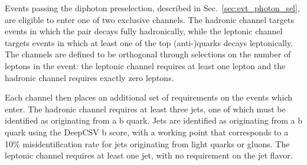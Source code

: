 Events passing the diphoton preselection, described in Sec.~\ref{sec:evt_photon_sel}, are eligible to enter one of two exclusive channels.
The hadronic channel targets \ttH events in which the \ttb pair decays fully hadronically, while the leptonic channel targets events in which at least one of the top (anti-)quarks decays leptonically.
The channels are defined to be orthogonal through selections on the number of leptons in the event: the leptonic channel requires at least one lepton and the hadronic channel requires exactly zero leptons.

Each channel then places an additional set of requirements on the events which enter.
The hadronic channel requires at least three jets, one of which must be identified as originating from a b quark.
Jets are identified as originating from a b quark using the DeepCSV b score, with a working point that corresponds to a 10\% misidentification rate for jets originating from light quarks or gluons.
The leptonic channel requires at least one jet, with no requirement on the jet flavor.
